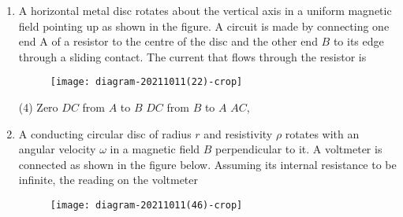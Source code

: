 \begin{enumerate}
	\begin{figure}[H]
		\centering
		\texttt{[image: diagram-20211028(5)-crop]}
	\end{figure}
	The magnitude $|i(t)|$ of the induced current in the wire loop, as a function of time $t$, is best represented as.
	{}
	\begin{tasks}(2)
		\task[\textbf{A.}] \begin{figure}[H]
			\centering
			\texttt{[image: diagram-20211028(6)-crop]}
		\end{figure}
		\task[\textbf{B.}] \begin{figure}[H]
			\centering
			\texttt{[image: diagram-20211028(7)-crop]}
		\end{figure}
		\task[\textbf{C.}] \begin{figure}[H]
			\centering
			\texttt{[image: diagram-20211028(8)-crop]}
		\end{figure}
		\task[\textbf{D.}] \begin{figure}[H]
			\centering
			\texttt{[image: diagram-20211028(9)-crop]}
		\end{figure}
	\end{tasks}
	\item A horizontal metal disc rotates about the vertical axis in a uniform magnetic field pointing up as shown in the figure. A circuit is made by connecting one end A of a resistor to the centre of the disc and the other end $B$ to its edge through a sliding contact. The current that flows through the resistor is
	{}
	\begin{figure}[H]
		\centering
		\texttt{[image: diagram-20211011(22)-crop]}
	\end{figure}
	\begin{tasks}(4)
		\task[\textbf{A.}] Zero
		\task[\textbf{B.}] $D C$ from $A$ to $B$
		\task[\textbf{C.}] $D C$ from $B$ to $A$
		\task[\textbf{D.}] $A C$,
	\end{tasks}
	\item  A conducting circular disc of radius $r$ and resistivity $\rho$ rotates with an angular velocity $\omega$ in a magnetic field $B$ perpendicular to it. A voltmeter is connected as shown in the figure below. Assuming its internal resistance to be infinite, the reading on the voltmeter
	{}
	\begin{figure}[H]
		\centering
		\texttt{[image: diagram-20211011(46)-crop]}

\end{figure}
\end{enumerate}

